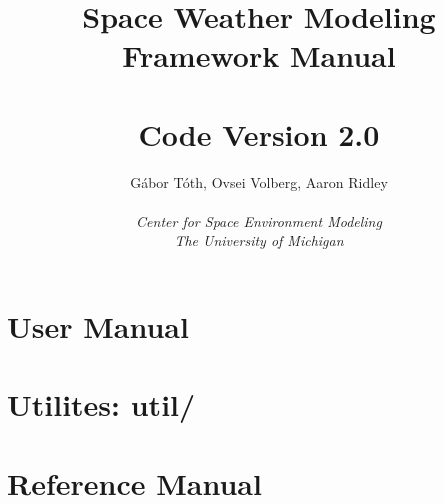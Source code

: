 \documentclass[twoside,10pt]{book}
\title{Space Weather Modeling Framework Manual \\ 
       \hfill \\
       \large Code Version 2.0}
\author{G\'abor T\'oth, Ovsei Volberg, Aaron Ridley\\
       \hfill \\
       {\it Center for Space Environment Modeling}\\
       {\it The University of Michigan}}
\begin{document}
\pagestyle{fancy}
\lhead[\fancyplain{}{\bfseries\thepage}]{\fancyplain{}{\bfseries\rightmark}}
\rhead[\fancyplain{}{\bfseries\leftmark}]{\fancyplain{}{\bfseries\thepage}}
\cfoot{}

\maketitle

\tableofcontents



\chapter{User Manual}











\chapter{Utilites: util/}



\chapter{Reference Manual}




\end{document}
